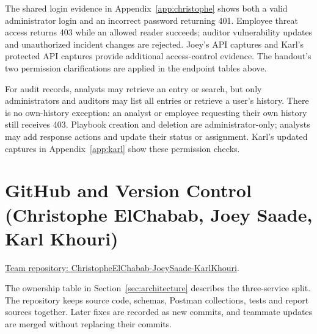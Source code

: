 \documentclass[11pt,a4paper]{article}
\begin{document}
The shared login evidence in Appendix~\ref{app:christophe} shows both a valid administrator login and an incorrect password returning 401. Employee threat access returns 403 while an allowed reader succeeds; auditor vulnerability updates and unauthorized incident changes are rejected. Joey's API captures and Karl's protected API captures provide additional access-control evidence. The handout's two permission clarifications are applied in the endpoint tables above.

For audit records, analysts may retrieve an entry or search, but only administrators and auditors may list all entries or retrieve a user's history. There is no own-history exception: an analyst or employee requesting their own history still receives 403. Playbook creation and deletion are administrator-only; analysts may add response actions and update their status or assignment. Karl's updated captures in Appendix~\ref{app:karl} show these permission checks.

\section{GitHub and Version Control (Christophe ElChabab, Joey Saade, Karl Khouri)}
\label{sec:git}
\href{https://github.com/chrs-005/ChristopheElChabab-JoeySaade-KarlKhouri}{Team repository: ChristopheElChabab-JoeySaade-KarlKhouri}.

The ownership table in Section~\ref{sec:architecture} describes the three-service split. The repository keeps source code, schemas, Postman collections, tests and report sources together. Later fixes are recorded as new commits, and teammate updates are merged without replacing their commits.
\end{document}
